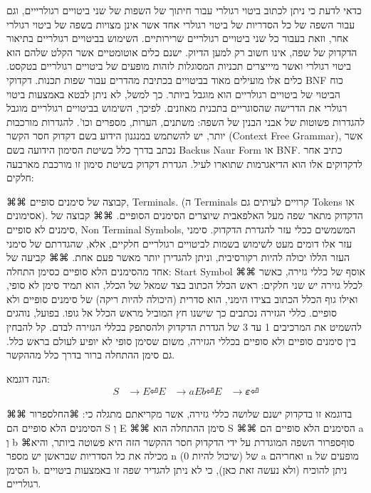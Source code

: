       כדאי לדעת כי ניתן לכתוב ביטוי רגולרי עבור חיתוך של השפות של שני ביטויים
      רגולרייים, וגם עבור השפה של כל הסדריות של ביטוי רגולרי אחד אשר אינן מצויות בשפה
      של ביטוי רגולרי אחר, וזאת בעבור כל שני ביטויים רגולריים שרירותיים. השימוש
      בביטויים רגולריים בתיאור הדקדוק של שפה, אינו חשוב רק למען הדיוק. ישנם כלים
      אוטומטיים אשר הקלט שלהם הוא ביטוי רגולרי ואשר מיייצרים תכניות המסוגלות לזהות
      מופעים של ביטויים רגולריים בטקסט. כלים אלו מועילים מאוד בביטויים בכתיבת מהדרים
      עבור שפות תכנות.
      דקדוקי BNF
      כוח הביטוי של ביטויים רגולריים הוא מוגבל ביותר. כך למשל, לא ניתן לבטא באמצעות
      ביטוי רגולרי את הדרישה שהסוגריים בתכנית מאוזנים. לפיכך, השימוש בביטויים
      רגולריים מוגבל להגדרות פשוטות של אבני הבנין של השפה: משתנים, הערות, מספרים
      וכו'. להגדרות מורכבות יותר, יש להשתמש במנגנון הידוע בשם דקדוק חסר הקשר
      (Context Free Grammar), אשר נכתב בדרך כלל בשיטת הסימון הידועה בשם Backus Naur
      Form או BNF. כתיב אחר לדקדוקים אלו הוא הדיאגרמות שתוארו לעיל.
      הגדרת דקדוק בשיטת סימון זו מורכבת מארבעה חלקים:
      \begin{enumerate}
      ⌘⌘ קבוצה של סימנים סופיים, Terminals. (ה Terminals קרויים
      לעיתים גם Tokens או אסימונים). הדקדוק מתאר שפה מעל האלפאבית
      שיוצרים הסימנים הסופיים.
      ⌘⌘ קבוצה של סימנים לא סופיים, Non Terminal Symbols, המשמשים
      ככלי עזר להגדרת הדקדוק. סימני עזר אלו דומים מעט לשימוש בשמות
      לביטויים רגולריים חלקיים, אלא, שהגדרתם של סימני העזר הללו
      יכולה להיות רקורסיבית, וניתן להגדירן יותר מאשר פעם אחת.
      ⌘⌘ קביעה של אחד מהסימנים הלא סופיים כסימן התחלה: Start Symbol
      ⌘⌘ אוסף של כללי גזירה, כאשר לכלל גזירה יש שני חלקים: ראש הכלל
      הכתוב בצד שמאל של הכלל, הוא תמיד סימן לא סופי, ואילו גוף הכלל
      הכתוב בצידו הימני, הוא סדרית (היכולה להיות ריקה) של סימנים
      סופיים ולא סופיים. כללי הגזירה נכתבים כך שישנו חץ המוביל מראש
      הכלל אל גופו. בפועל, נוהגים להשמיט את המרכיבים 1 עד 3 של
      הגדרת הדקדוק ולהסתפק בכללי הגזירה לבדם. קל להבחין בין סימנים
      סופיים ולא סופיים בכללי הגזירה, משום שסימן סופי לא יופיע
      לעולם בראש כלל. גם סימן ההתחלה ברור בדרך כלל מההקשר.
      \end{enumerate}
      הנה דוגמא:
      \begin{align}
        S &→E ⏎
        E &→a E b ⏎
        E &→𝜺 ⏎
      \end{align}

      בדוגמא זו בדקדוק ישנם שלושה כללי גזירה, אשר מקריאתם מתגלה כי:
   ⌘החל{ספרור}
      ⌘⌘ הסימנים הלא סופיים הם S וְ E
      ⌘⌘ סימן ההתחלה הוא S
      ⌘⌘ הסימנים הלא סופיים הם a וְ b
  ⌘סוף{ספרור}
      השפה המוגדרת על ידי הדקדוק חסר ההקשר הזה היא פשוטה ביותר, והיא מכילה את כל
      הסדריות שבראשן יש מספר n (שיכול להיות 0) של a ואחריהם n מופעים של הסימן b.
      ניתן להוכיח (ולא נעשה זאת כאן), כי לא ניתן להגדיר שפה זו באמצעות ביטויים
      רגולריים.

